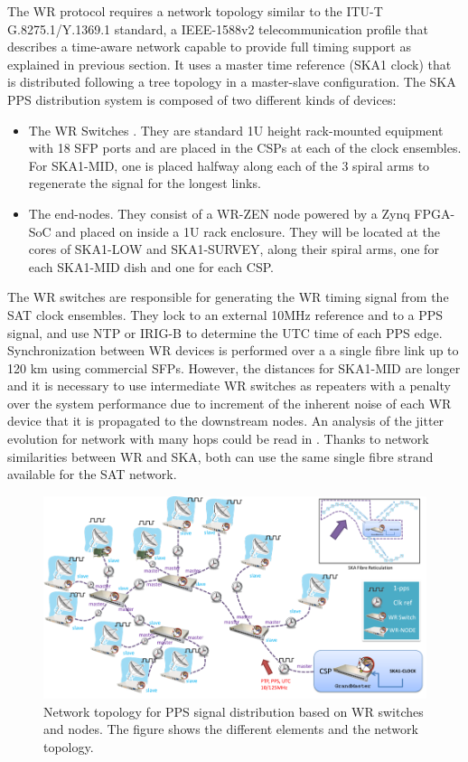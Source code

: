 The WR protocol requires a network topology similar to the ITU-T G.8275.1/Y.1369.1 standard, a IEEE-1588v2 telecommunication profile that describes a time-aware network capable to provide full timing support \cite{itu:TG8275_1_Y_1369_1} as explained in previous section. It uses a master time reference (SKA1 clock) that is distributed following a tree topology in a master-slave configuration. The SKA PPS distribution system is composed of two different kinds of devices: 

\begin{itemize}
	\item {The WR Switches \cite{sevensols:wr_switch}. They are standard 1U height rack-mounted equipment with 18 SFP ports and are placed in the CSPs at each of the clock ensembles. For SKA1-MID, one is placed halfway along each of the 3 spiral arms to regenerate the signal for the longest links.}
	\item{The end-nodes. They consist of a WR-ZEN node \cite{sevensols:wr_zen} powered by a Zynq FPGA-SoC and placed on inside a 1U rack enclosure. They will be located at the cores of SKA1-LOW and SKA1-SURVEY, along their spiral arms, one for each SKA1-MID dish and one for each CSP.}
\end{itemize}

The WR switches are responsible for generating the WR timing signal from the SAT clock ensembles. They lock to an external 10MHz reference and to a PPS signal, and use NTP or IRIG-B to determine the UTC time of each PPS edge. Synchronization between WR devices is performed over a a single fibre link up to 120 km using commercial SFPs.
However, the distances for SKA1-MID are longer and it is necessary to use 
intermediate WR switches as repeaters with a penalty over the system 
performance due to increment of the inherent noise of each WR device that it is 
propagated to the downstream nodes. An analysis of the jitter evolution for 
network with many hops could be read in \cite{torres2016scalability}. Thanks to 
network similarities between WR and SKA, both can use the same single fibre
strand available for the SAT network. 

\begin{figure}[H]
	\centering
	\includegraphics[scale=0.4]{img/ska_pps_network}
	\caption{Network topology for PPS signal distribution based on WR switches and nodes. The figure shows the different elements and the network topology. }
	\label{fig:ska_pps_dist_network}
\end{figure}

